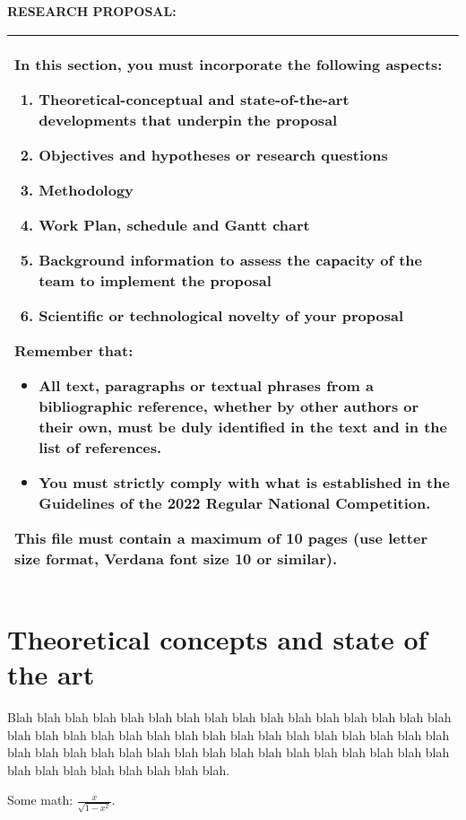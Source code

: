 \noindent\textbf{RESEARCH PROPOSAL:}

\bigskip

\noindent\begin{tabularx}{\textwidth}{|>{\columncolor{tcc}}X|}
\hline
In this section, you must incorporate the following aspects:
\begin{enumerate}[label={\alph*)},nosep]
\item Theoretical-conceptual and state-of-the-art developments that underpin the proposal
\item Objectives and hypotheses or research questions
\item Methodology
\item Work Plan, schedule and Gantt chart
\item Background information to assess the capacity of the team to implement the proposal
\item Scientific or technological novelty of your proposal
\end{enumerate}

\medskip

Remember that:
\begin{itemize}[label={-},nosep]
\item All text, paragraphs or textual phrases from a bibliographic reference, whether by other authors or their own, must be duly identified in the text and in the list of references.
\item You must strictly comply with what is established in the Guidelines of the 2022 Regular National Competition.
\end{itemize}

\medskip

This file must contain a maximum of \textbf{10 pages} (use letter size format, Verdana font size 10 or similar).\\
\hline
\end{tabularx}

\section{Theoretical concepts and state of the art}

Blah blah blah blah blah blah blah blah blah blah blah blah blah blah blah blah blah blah blah blah blah blah blah blah blah blah blah blah blah blah blah blah blah blah blah blah blah blah blah blah blah blah blah blah blah blah blah blah blah blah blah blah blah blah blah blah.

Some math: $\frac{x}{\sqrt{1-x^2}}$.

